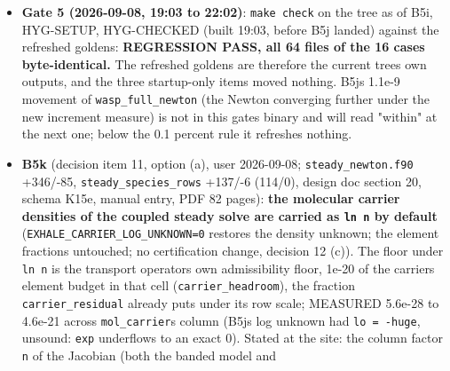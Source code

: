 \documentclass[english,a4paper]{my_memo}
\begin{document}
\begin{itemize}
  215) and a constrained optimum to the solver, so a bound-constrained
  stationary state has a multiplier there, not a zero row (decision item
  12); 28 of 64 steps of configuration (a) are the Cauchy point alone (Bertsekas\textquotesingle{}
  two-metric projection not taken); \texttt{load\_IC} refuses a molecular restart
  written at the input\textquotesingle s own He/H by comparing printed digits for equality
  (\texttt{7.9307E-02} against \texttt{0.0793}). Advisor: \texttt{wasp\_full\_newton} re-run on
  the matrix path (marching then Newton) with the B5j binary against the
  refreshed golden: movement 5.9e-9 (\texttt{Hydro\_ioniz.txt}) and 9.6e-9
  (\texttt{Ion\_species.txt}), 13 outer iterations to \texttt{\textbar{}\textbar{}R\textbar{}\textbar{}\ =\ 4.3e-9}, CERTIFIED,
  log10 Mdot 13.30; below the 0.1 percent rule, golden untouched.
\item
  \textbf{Gate 5 (2026-09-08, 19:03 to 22:02)}: \texttt{make\ check} on the tree as of
  B5i, HYG-SETUP, HYG-CHECKED (built 19:03, before B5j landed) against the
  refreshed goldens: \textbf{REGRESSION PASS, all 64 files of the 16 cases
  byte-identical.} The refreshed goldens are therefore the current tree\textquotesingle s
  own outputs, and the three startup-only items moved nothing. B5j\textquotesingle s
  1.1e-9 movement of \texttt{wasp\_full\_newton} (the Newton converging further
  under the new increment measure) is not in this gate\textquotesingle s binary and will
  read "within" at the next one; below the 0.1 percent rule it refreshes
  nothing.
\item
  \textbf{B5k} (decision item 11, option (a), user 2026-09-08; \texttt{steady\_newton.f90}
  +346/-85, \texttt{steady\_species\_rows} +137/-6 (114/0), design doc section 20,
  schema K15e, manual entry, PDF 82 pages): \textbf{the molecular carrier
  densities of the coupled steady solve are carried as \texttt{ln\ n} by default}
  (\texttt{EXHALE\_CARRIER\_LOG\_UNKNOWN=0} restores the density unknown; the element
  fractions untouched; no certification change, decision 12 (c)). The
  floor under \texttt{ln\ n} is the transport operator\textquotesingle s own admissibility floor,
  1e-20 of the carrier\textquotesingle s element budget in that cell (\texttt{carrier\_headroom}),
  the fraction \texttt{carrier\_residual} already puts under its row scale;
  MEASURED 5.6e-28 to 4.6e-21 across \texttt{mol\_carrier}\textquotesingle s column (B5j\textquotesingle s log unknown had
  \texttt{lo\ =\ -huge}, unsound: \texttt{exp} underflows to an exact 0). Stated at the
  site: the column factor \texttt{n} of the Jacobian (both the banded model and

\end{itemize}
\end{document}
